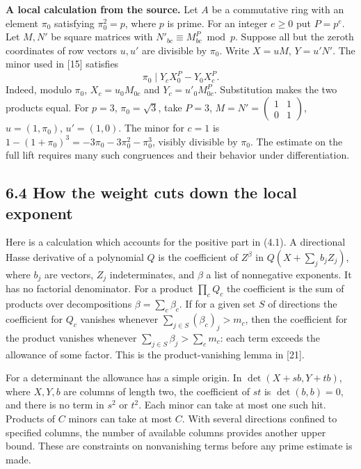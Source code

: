 \documentclass[11pt,letterpaper]{article}
\begin{document}
{\textbf{A local calculation from the source.} Let $A$ be a commutative ring with an element $\pi_0$ satisfying $\pi_0^2=p$, where $p$ is prime. For an integer $e\ge0$ put $P=p^e$. Let $M,N'$ be square matrices with $N'_{bc}\equiv M_{bc}^P\bmod p$. Suppose all but the zeroth coordinates of row vectors $u,u'$ are divisible by $\pi_0$. Write $X=uM$, $Y=u'N'$. The minor used in [15] satisfies
\begin{equation}\label{D:84}
 \pi_0\mid Y_c X_0^P-Y_0 X_c^P .
\end{equation}
Indeed, modulo $\pi_0$, $X_c=u_0M_{0c}$ and $Y_c=u'_0 M_{0c}^P$. Substitution makes the two products equal. For $p=3$, $\pi_0=\sqrt3$, take $P=3$, $M=N'=\left(\begin{smallmatrix}1&1\\0&1\end{smallmatrix}\right)$, $u=(1,\pi_0)$, $u'=(1,0)$. The minor for $c=1$ is $1-(1+\pi_0)^3=-3\pi_0-3\pi_0^2-\pi_0^3$, visibly divisible by $\pi_0$. The estimate on the full lift requires many such congruences and their behavior under differentiation.

\newpage
\subsection*{6.4 How the weight cuts down the local exponent}

Here is a calculation which accounts for the positive part in (4.1). A directional Hasse derivative of a polynomial $Q$ is the coefficient of $Z^\beta$ in $Q(X+\sum_j b_j Z_j)$, where $b_j$ are vectors, $Z_j$ indeterminates, and $\beta$ a list of nonnegative exponents. It has no factorial denominator. For a product $\prod_c Q_c$ the coefficient is the sum of products over decompositions $\beta=\sum_c\beta_c$. If for a given set $S$ of directions the coefficient for $Q_c$ vanishes whenever $\sum_{j\in S}(\beta_c)_j>m_c$, then the coefficient for the product vanishes whenever $\sum_{j\in S}\beta_j>\sum_c m_c$: each term exceeds the allowance of some factor. This is the product-vanishing lemma in [21].

For a determinant the allowance has a simple origin. In $\det(X+s b,Y+t b)$, where $X,Y,b$ are columns of length two, the coefficient of $st$ is $\det(b,b)=0$, and there is no term in $s^2$ or $t^2$. Each minor can take at most one such hit. Products of $C$ minors can take at most $C$. With several directions confined to specified columns, the number of available columns provides another upper bound. These are constraints on nonvanishing terms before any prime estimate is made.

}
\end{document}
